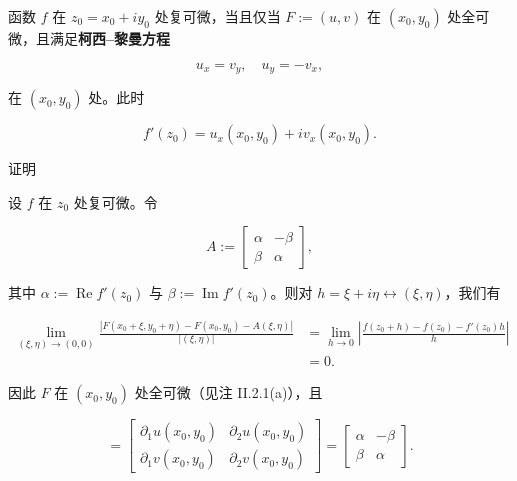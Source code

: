 \begin{theorem}

函数 $ f $ 在 $ z_0 = x_0 + iy_0 $ 处复可微，当且仅当 $ F := (u,v) $ 在 $ (x_0, y_0) $ 处全可微，且满足\textbf{柯西–黎曼方程}

\[
u_x = v_y , \quad u_y = -v_x ,
\]

在 $ (x_0, y_0) $ 处。此时

\[
f'(z_0) = u_x(x_0, y_0) + i v_x(x_0, y_0) .
\]

证明

\begin{subitems}
\item

设 $ f $ 在 $ z_0 $ 处复可微。令

\begin{equation*}
A := \begin{bmatrix} \alpha & -\beta \\ \beta & \alpha \end{bmatrix} ,
\end{equation*}

其中 $ \alpha := \operatorname{Re} f'(z_0) $ 与 $ \beta := \operatorname{Im} f'(z_0) $。则对 $ h = \xi + i\eta \leftrightarrow (\xi, \eta) $，我们有

\begin{equation*}
\begin{aligned}
\lim_{(\xi,\eta) \to (0,0)} \frac{|F(x_0 + \xi, y_0 + \eta) - F(x_0, y_0) - A(\xi, \eta)|}{|(\xi, \eta)|} &= \lim_{h \to 0} \left| \frac{f(z_0 + h) - f(z_0) - f'(z_0)h}{h} \right| \\ &= 0 .
\end{aligned}
\end{equation*}

因此 $ F $ 在 $ (x_0, y_0) $ 处全可微（见注 II.2.1(a)），且

\begin{equation*}
[\partial F(x_0, y_0)] = \begin{bmatrix} \partial_1 u(x_0, y_0) & \partial_2 u(x_0, y_0) \\ \partial_1 v(x_0, y_0) & \partial_2 v(x_0, y_0) \end{bmatrix} = \begin{bmatrix} \alpha & -\beta \\ \beta & \alpha \end{bmatrix} .
\end{equation*}


\end{subitems}
\end{theorem}
